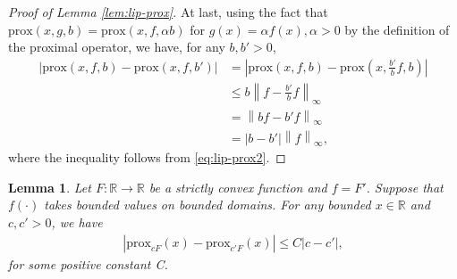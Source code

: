 \documentclass[12pt,reqno]{amsart}
\newtheorem{lemma}{Lemma}
\newcommand{\abs}[1]{\left\lvert#1\right\rvert}
\newcommand{\norm}[1]{\left\lVert#1\right\rVert}
\newcommand{\rbr}[1]{\left(#1\right)}
\newcommand{\R}{\mathbb{R}}
\newcommand{\prox}{\mathrm{prox}}
\begin{document}
\begin{proof}[Proof of Lemma \ref{lem:lip-prox}]
At last, using the fact that $\prox(x,g,b)=\prox(x,f,\alpha b)$ for $g(x)=\alpha f(x), \alpha>0$ by the definition of the proximal operator, we have, for any $b,b'>0$,
\begin{align*}
    \abs{\prox(x,f,b)-\prox(x,f,b')}
    &= \abs{\prox(x,f,b)-\prox\rbr{x,\frac{b'}{b}f,b}}\\
    &\le b\norm{f-\frac{b'}{b}f}_\infty\\
    &=\norm{bf-b'f}_\infty\\
    &=\abs{b-b'}\norm{f}_\infty,
\end{align*}
where the inequality follows from \eqref{eq:lip-prox2}.
\end{proof}

\begin{lemma}
\label{lem:prox-bounded}
Let $F:\R\to\R$ be a strictly convex function and $f=F'$. Suppose that $f(\cdot)$ takes bounded values on bounded domains. For any bounded $x\in\R$ and $c,c'>0$, we have
\begin{align*}
    \abs{\prox_{cF}(x)-\prox_{c'F}(x)}\le C\abs{c-c'},
\end{align*}
for some positive constant C.
\end{lemma}
\end{document}
